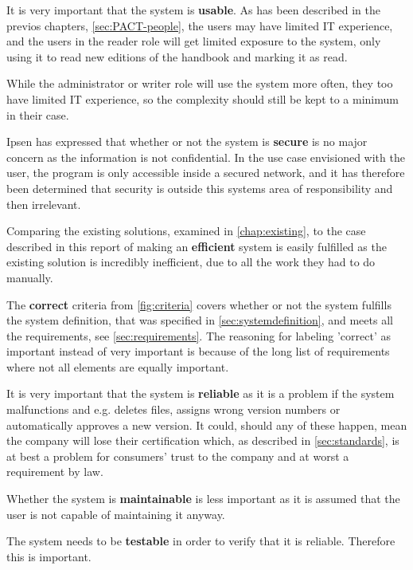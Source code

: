 \documentclass[../../master.tex]{subfiles}
\begin{document}
It is very important that the system is \textbf{usable}.
As has been described in the previos chapters, \cref{sec:PACT-people}, the users may have limited IT experience, and the users in the reader role will get limited exposure to the system, only using it to read new editions of the handbook and marking it as read.

While the administrator or writer role will use the system more often, they too have limited IT experience, so the complexity should still be kept to a minimum in their case.

Ipsen has expressed that whether or not the system is \textbf{secure} is no major concern as the information is not confidential.
In the use case envisioned with the user, the program is only accessible inside a secured network, and it has therefore been determined that security is outside this systems area of responsibility and then irrelevant.

Comparing the existing solutions, examined in \cref{chap:existing}, to the case described in this report of making an \textbf{efficient} system is easily fulfilled as the existing solution is incredibly inefficient, due to all the work they had to do manually.

The \textbf{correct} criteria from \cref{fig:criteria} covers whether or not the system fulfills the system definition, that was specified in \cref{sec:systemdefinition}, and meets all the requirements, see \cref{sec:requirements}.
The reasoning for labeling 'correct' as important instead of very important is because of the long list of requirements where not all elements are equally important.

It is very important that the system is \textbf{reliable} as it is a problem if the system malfunctions and e.g. deletes files, assigns wrong version numbers or automatically approves a new version.
It could, should any of these happen, mean the company will lose their certification which, as described in \cref{sec:standards}, is at best a problem for consumers' trust to the company and at worst a requirement by law.

Whether the system is \textbf{maintainable} is less important as it is assumed that the user is not capable of maintaining it anyway.

The system needs to be \textbf{testable} in order to verify that it is reliable.
Therefore this is important.
\end{document}
